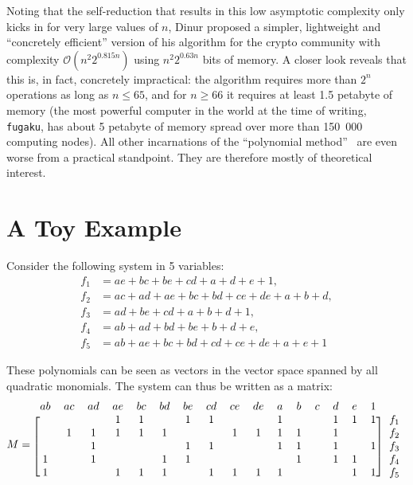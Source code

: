 \documentclass[a4paper,UKenglish,cleveref, autoref]{lipics-v2019}
\newcommand{\bigO}[1]{\ensuremath{\mathcal{O}\left( #1 \right)} }
\begin{document}
Noting that the self-reduction that results in this low asymptotic complexity
only kicks in for very large values of $n$, Dinur proposed a simpler,
lightweight and ``concretely efficient'' version of his algorithm for the crypto
community with complexity $\bigO{n^2 2^{0.815n}}$ using $n^2 2^{0.63n}$ bits of
memory. A closer look reveals that this is, in fact, concretely impractical: the
algorithm requires more than $2^n$ operations as long as $n \leq 65$, and for
$n \geq 66$ it requires at least 1.5 petabyte of memory (the most powerful
computer in the world at the time of writing, \texttt{fugaku}, has about 5
petabyte of memory spread over more than 150\ 000 computing nodes). All other
incarnations of the ``polynomial
method''~\cite{LokshtanovPTWY17,BjorklundK019,Dinur21} are even worse from a
practical standpoint.  They are therefore mostly of theoretical interest.


\section{A Toy Example}

Consider the following system in 5 variables:
\begin{align*}
  f_1 &= ae + bc + be + cd + a + d + e + 1,\\
  f_2 &= ac + ad + ae + bc + bd + ce + de + a + b + d,\\
  f_3 &= ad + be + cd  + a + b + d + 1,\\
  f_4 &= ab + ad + bd + be + b + d + e,\\            
  f_5 &= ab + ae + bc + bd + cd + ce + de + a + e + 1
\end{align*}



These polynomials can be seen as vectors in the vector space spanned by all
quadratic monomials. The system can thus be written as a matrix:
\[
  M = \begin{blockarray}{ccccccccccccccccc}
  ab & ac & ad & ae & bc & bd & be & cd & ce & de & a & b & c & d & e & 1 & \\
  \begin{block}{[cccccccccccccccc]c}
     &    &    & 1  & 1  &    & 1  & 1  &    &    & 1 &   &   & 1 & 1 & 1 & f_1\\
     & 1  & 1  & 1  & 1  & 1  &    &    & 1  & 1  & 1 & 1 &   & 1 &   &   & f_2 \\
     &    & 1  &    &    &    & 1  & 1  &    &    & 1 & 1 &   & 1 &   & 1 & f_3 \\
   1 &    & 1  &    &    & 1  & 1  &    &    &    &   & 1 &   & 1 & 1 &   & f_4 \\
   1 &    &    & 1  & 1  & 1  &    & 1  & 1  & 1  & 1 &   &   &   & 1 & 1 & f_5 \\
    \end{block}
\end{blockarray}
\]
\end{document}
